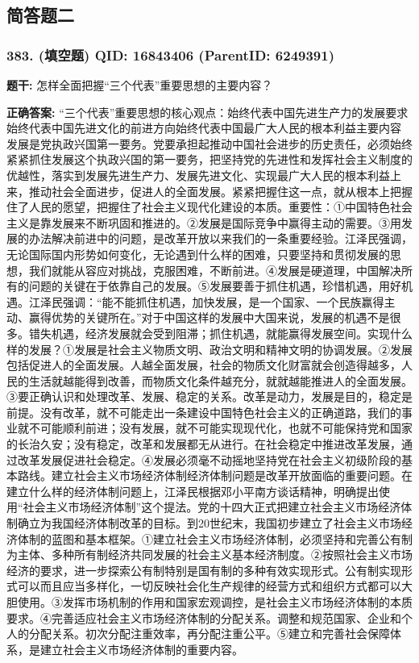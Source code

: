 \documentclass[12pt,UTF8]{ctexart}
\begin{document}
\vspace{0.3em}\hrulefill\vspace{0.7em}

\subsection*{简答题二}

\subsubsection*{383. (填空题) \small QID: 16843406 (ParentID: 6249391)}

\textbf{题干:}
怎样全面把握“三个代表”重要思想的主要内容？



\textbf{正确答案:}
“三个代表”重要思想的核心观点：始终代表中国先进生产力的发展要求
始终代表中国先进文化的前进方向始终代表中国最广大人民的根本利益主要内容
发展是党执政兴国第一要务。党要承担起推动中国社会进步的历史责任，必须始终紧紧抓住发展这个执政兴国的第一要务，把坚持党的先进性和发挥社会主义制度的优越性，落实到发展先进生产力、发展先进文化、实现最广大人民的根本利益上来，推动社会全面进步，促进人的全面发展。紧紧把握住这一点，就从根本上把握住了人民的愿望，把握住了社会主义现代化建设的本质。重要性：①中国特色社会主义是靠发展来不断巩固和推进的。②发展是国际竞争中赢得主动的需要。③用发展的办法解决前进中的问题，是改革开放以来我们的一条重要经验。江泽民强调，无论国际国内形势如何变化，无论遇到什么样的困难，只要坚持和贯彻发展的思想，我们就能从容应对挑战，克服困难，不断前进。④发展是硬道理，中国解决所有的问题的关键在于依靠自己的发展。⑤发展要善于抓住机遇，珍惜机遇，用好机遇。江泽民强调：“能不能抓住机遇，加快发展，是一个国家、一个民族赢得主动、赢得优势的关键所在。”对于中国这样的发展中大国来说，发展的机遇不是很多。错失机遇，经济发展就会受到阻滞；抓住机遇，就能赢得发展空间。实现什么样的发展？①发展是社会主义物质文明、政治文明和精神文明的协调发展。②发展包括促进人的全面发展。人越全面发展，社会的物质文化财富就会创造得越多，人民的生活就越能得到改善，而物质文化条件越充分，就就越能推进人的全面发展。③要正确认识和处理改革、发展、稳定的关系。改革是动力，发展是目的，稳定是前提。没有改革，就不可能走出一条建设中国特色社会主义的正确道路，我们的事业就不可能顺利前进；没有发展，就不可能实现现代化，也就不可能保持党和国家的长治久安；没有稳定，改革和发展都无从进行。在社会稳定中推进改革发展，通过改革发展促进社会稳定。④发展必须毫不动摇地坚持党在社会主义初级阶段的基本路线。建立社会主义市场经济体制经济体制问题是改革开放面临的重要问题。在建立什么样的经济体制问题上，江泽民根据邓小平南方谈话精神，明确提出使用“社会主义市场经济体制”这个提法。党的十四大正式把建立社会主义市场经济体制确立为我国经济体制改革的目标。到20世纪末，我国初步建立了社会主义市场经济体制的蓝图和基本框架。①建立社会主义市场经济体制，必须坚持和完善公有制为主体、多种所有制经济共同发展的社会主义基本经济制度。②按照社会主义市场经济的要求，进一步探索公有制特别是国有制的多种有效实现形式。公有制实现形式可以而且应当多样化，一切反映社会化生产规律的经营方式和组织方式都可以大胆使用。③发挥市场机制的作用和国家宏观调控，是社会主义市场经济体制的本质要求。④完善适应社会主义市场经济体制的分配关系。调整和规范国家、企业和个人的分配关系。初次分配注重效率，再分配注重公平。⑤建立和完善社会保障体系，是建立社会主义市场经济体制的重要内容。
\end{document}
